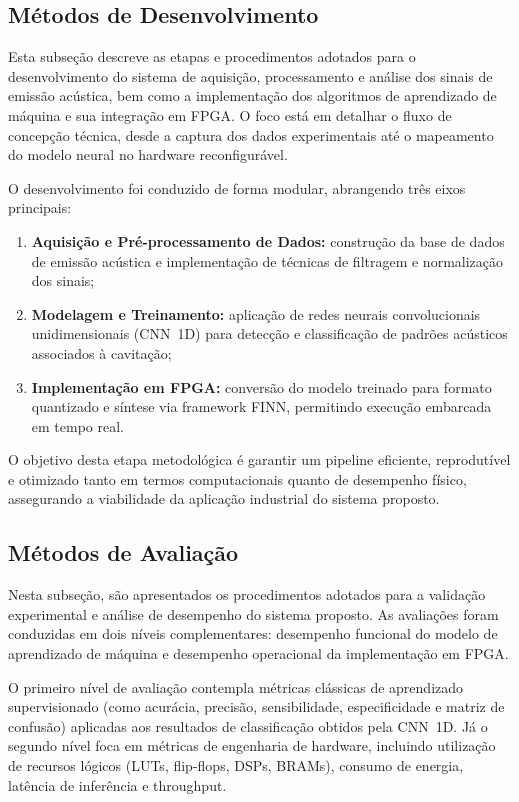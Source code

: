 \subsection*{Métodos de Desenvolvimento}

Esta subseção descreve as etapas e procedimentos adotados para o desenvolvimento do sistema de aquisição, processamento e análise dos sinais de emissão acústica, bem como a implementação dos algoritmos de aprendizado de máquina e sua integração em FPGA. O foco está em detalhar o fluxo de concepção técnica, desde a captura dos dados experimentais até o mapeamento do modelo neural no hardware reconfigurável.

O desenvolvimento foi conduzido de forma modular, abrangendo três eixos principais:
\begin{enumerate}
    \item \textbf{Aquisição e Pré-processamento de Dados:} construção da base de dados de emissão acústica e implementação de técnicas de filtragem e normalização dos sinais;
    \item \textbf{Modelagem e Treinamento:} aplicação de redes neurais convolucionais unidimensionais (CNN~1D) para detecção e classificação de padrões acústicos associados à cavitação;
    \item \textbf{Implementação em FPGA:} conversão do modelo treinado para formato quantizado e síntese via framework FINN, permitindo execução embarcada em tempo real.
\end{enumerate}

O objetivo desta etapa metodológica é garantir um pipeline eficiente, reprodutível e otimizado tanto em termos computacionais quanto de desempenho físico, assegurando a viabilidade da aplicação industrial do sistema proposto.

\subsection*{Métodos de Avaliação}

Nesta subseção, são apresentados os procedimentos adotados para a validação experimental e análise de desempenho do sistema proposto. As avaliações foram conduzidas em dois níveis complementares: desempenho funcional do modelo de aprendizado de máquina e desempenho operacional da implementação em FPGA.

O primeiro nível de avaliação contempla métricas clássicas de aprendizado supervisionado (como acurácia, precisão, sensibilidade, especificidade e matriz de confusão) aplicadas aos resultados de classificação obtidos pela CNN~1D. Já o segundo nível foca em métricas de engenharia de hardware, incluindo utilização de recursos lógicos (LUTs, flip-flops, DSPs, BRAMs), consumo de energia, latência de inferência e throughput.

